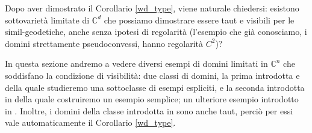 Dopo aver dimostrato il Corollario \ref{wd_type}, viene naturale chiedersi: esistono sottovarietà limitate di $\mathbb{C}^d$ che possiamo dimostrare essere taut e visibili per le simil-geodetiche, anche senza ipotesi di regolarità (l'esempio che già conosciamo, i domini strettamente pseudoconvessi, hanno regolarità $C^2$)?

In questa sezione andremo a vedere diversi esempi di domini limitati in $\mathbb{C}^n$ che soddisfano la condizione di visibilità: due classi di domini, la prima introdotta \cite{BZ1} e della quale studieremo una sottoclasse di esempi espliciti, e la seconda introdotta in \cite{BM} della quale costruiremo un esempio semplice; un ulteriore esempio introdotto in \cite{CMS}. Inoltre, i domini della classe introdotta in \cite{BM} sono anche taut, perciò per essi vale automaticamente il Corollario \ref{wd_type}.